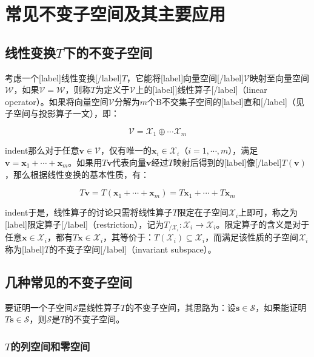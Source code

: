 \documentclass[UTF8,nofonts]{ctexart}
\begin{document}

\section*{常见不变子空间及其主要应用}

\subsection*{线性变换$T$下的不变子空间}

考虑一个[label]线性变换[/label]$T$，它能将[label]向量空间[/label]$\mathcal{V}$映射至向量空间$\mathcal{W}$，如果$\mathcal{V}=\mathcal{W}$，则称$T$为定义于$\mathcal{V}$上的[label]]线性算子[/label]（linear operator）。如果将向量空间$\mathcal{V}$分解为$m$个B不交集子空间的[label]直和[/label]（见子空间与投影算子一文），即：

\[\mathcal{V}=\mathcal{X}_1\oplus\cdots\mathcal{X}_m\]

indent那么对于任意$\boldsymbol{v}\in\mathcal{V}$，仅有唯一的$\boldsymbol{x}_i\in\mathcal{X}_i$（$i=1,\cdots,m$），满足$\boldsymbol{v}=\boldsymbol{x}_1+\cdots+\boldsymbol{x}_m$。如果用$T\boldsymbol{v}$代表向量$\boldsymbol{v}$经过$T$映射后得到的[label]像[/label]$T(\boldsymbol{v})$，那么根据线性变换的基本性质，有：

\[
T\boldsymbol{v}=T(\boldsymbol{x}_1+\cdots+\boldsymbol{x}_m)=T\boldsymbol{x}_1+\cdots+T\boldsymbol{x}_m
\]

indent于是，线性算子的讨论只需将线性算子$T$限定在子空间$\mathcal{X}_i$上即可，称之为[label]限定算子[/label]（restriction），记为$T_{/\mathcal{X}_i}:\mathcal{X}_i\to\mathcal{X}_i$。限定算子的含义是对于任意$\boldsymbol{x}\in\mathcal{X}_i$，都有$T\boldsymbol{x}\in\mathcal{X}_i$，其等价于：$T(\mathcal{X}_i)\subseteq\mathcal{X}_i$，而满足该性质的子空间$\mathcal{X}_i$称为[label]$T$的不变子空间[/label]（invariant subspace）。

\subsection*{几种常见的不变子空间}

要证明一个子空间$\mathcal{S}$是线性算子$T$的不变子空间，其思路为：设$\boldsymbol{s}\in\mathcal{S}$，如果能证明$T\boldsymbol{s}\in\mathcal{S}$，则$\mathcal{S}$是$T$的不变子空间。

\subsubsection*{$T$的列空间和零空间}
\end{document}
